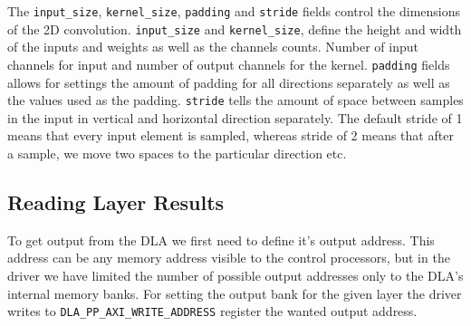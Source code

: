 \documentclass[12pt,a4paper,english
]{tunithesis}
\begin{document}
The \texttt{input\_size}, \texttt{kernel\_size}, \texttt{padding} and \texttt{stride} fields control the dimensions of the 2D convolution. \texttt{input\_size} and \texttt{kernel\_size}, define the height and width of the inputs and weights as well as the channels counts. Number of input channels for input and number of output channels for the kernel. \texttt{padding} fields allows for settings the amount of padding for all directions separately as well as the values used as the padding. \texttt{stride} tells the amount of space between samples in the input in vertical and horizontal direction separately. The default stride of 1 means that every input element is sampled, whereas stride of 2 means that after a sample, we move two spaces to the particular direction etc.





\subsection{Reading Layer Results}
To get output from the DLA we first need to define it's output address. This address can be any memory address visible to the control processors, but in the driver we have limited the number of possible output addresses only to the DLA's internal memory banks. For setting the output bank for the given layer the driver writes to \texttt{DLA\_PP\_AXI\_WRITE\_ADDRESS} register the wanted output address.
\end{document}
